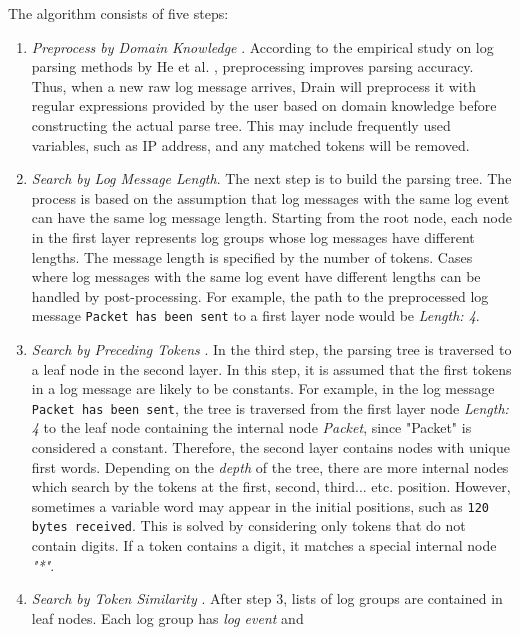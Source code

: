     The algorithm consists of five steps: 
    
    \begin{enumerate}
        \item \textit{Preprocess by Domain Knowledge }. According to the empirical study on log parsing methods by He et al. \cite{logParsingEvaluation2016}, preprocessing improves parsing accuracy. Thus, when a new raw log message arrives, Drain will preprocess it with regular expressions provided by the user based on domain knowledge before constructing the actual parse tree. This may include frequently used variables, such as IP address, and any matched tokens will be removed. 
        
        \item \textit{Search by Log Message Length}. The next step is to build the parsing tree. The process is based on the assumption that log messages with the same log event can have the same log message length. Starting from the root node, each node in the first layer represents log groups whose log messages have different lengths. The message length is specified by the number of tokens. Cases where log messages with the same log event have different lengths can be handled by post-processing. For example, the path to the preprocessed log message \texttt{Packet has been sent} to a first layer node would be \textit{Length: 4}.
        
        \item \textit{Search by Preceding Tokens }. In the third step, the parsing tree is traversed to a leaf node in the second layer. In this step, it is assumed that the first tokens in a log message are likely to be constants. For example, in the log message \texttt{Packet has been sent}, the tree is traversed from the first layer node \textit{Length: 4} to the leaf node containing the internal node \textit{Packet}, since "Packet" is considered a constant. Therefore, the second layer contains nodes with unique first words. Depending on the \textit{depth} of the tree, there are more internal nodes which search by the tokens at the first, second, third... etc. position. However, sometimes a variable word may appear in the initial positions, such as \texttt{120 bytes received}. This is solved by considering only tokens that do not contain digits. If a token contains a digit, it matches a special internal node \textit{"*"}. 
        \item \textit{Search by Token Similarity }. After step 3, lists of log groups are contained in leaf nodes. Each log group has \textit{log event} and
        

\end{enumerate}
